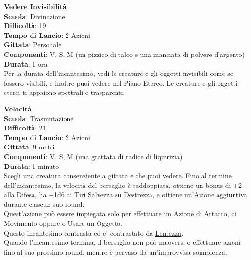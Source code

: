 \begin{multicols}{2}
\medskip\textbf{Vedere Invisibilità}\\
\textbf{Scuola}: Divinazione\\
\textbf{Difficoltà}: 19\\
\textbf{Tempo di Lancio}: 2 Azioni\\
\textbf{Gittata}: Personale\\
\textbf{Componenti}: V, S, M (un pizzico di talco e una manciata di polvere d'argento)\\
\textbf{Durata}: 1 ora\\
Per la durata dell'incantesimo, vedi le creature e gli oggetti invisibili come se fossero visibili, e inoltre puoi vedere nel Piano Etereo. Le creature e gli oggetti eterei ti appaiono spettrali e trasparenti.

\medskip\textbf{Velocità}\\
\textbf{Scuola}: Trasmutazione\\
\textbf{Difficoltà}: 21\\
\textbf{Tempo di Lancio}: 2 Azioni\\
\textbf{Gittata}: 9 metri\\
\textbf{Componenti}: V, S, M (una grattata di radice di liquirizia)\\
\textbf{Durata}: 1 minuto\\
Scegli una creatura consenziente a gittata e che puoi vedere. Fino al termine dell'incantesimo, la velocità del bersaglio è raddoppiata, ottiene un bonus di +2 alla Difesa, ha +1d6 ai Tiri Salvezza su Destrezza, e ottiene un'Azione aggiuntiva durante ciascun suo round.\\
Quest'azione può essere impiegata solo per effettuare un Azione di Attacco, di Movimento oppure o Usare un Oggetto.\\
Questo incantesimo contrasta ed e' contrastato da \hyperlink{lentezza}{Lentezza}.\\
Quando l'incantesimo termina, il bersaglio non può muoversi o effettuare azioni fino al suo prossimo round, mentre è pervaso da un'improvvisa sonnolenza.


\end{multicols}
